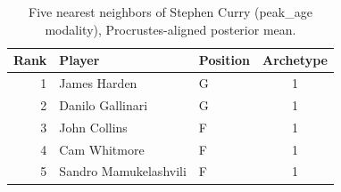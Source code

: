\begin{table}[htbp]
  \centering\small
  \begin{tabular}{rllc}
    \toprule
    Rank & Player & Position & Archetype \\
    \midrule
    1 & James Harden & G & 1 \\
    2 & Danilo Gallinari & G & 1 \\
    3 & John Collins & F & 1 \\
    4 & Cam Whitmore & F & 1 \\
    5 & Sandro Mamukelashvili & F & 1 \\
    \bottomrule
  \end{tabular}
  \caption{Five nearest neighbors of Stephen Curry (peak_age modality), Procrustes-aligned posterior mean.}
  \label{tab:Stephen_Curry_neighbors_peak_age}
\end{table}

